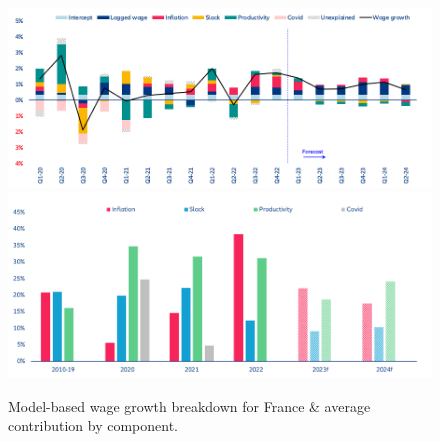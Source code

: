 \begin{figure}[H]
    \centering
    \caption{Model-based wage growth breakdown for France \& average contribution by component.}
    \includegraphics[width=.8\textwidth]{Core/2.Labour/img/Franceb1.png}
    \includegraphics[width=.8\textwidth]{Core/2.Labour/img/Franceb2.png}
    \label{figure:frbreakdown}
\end{figure}

